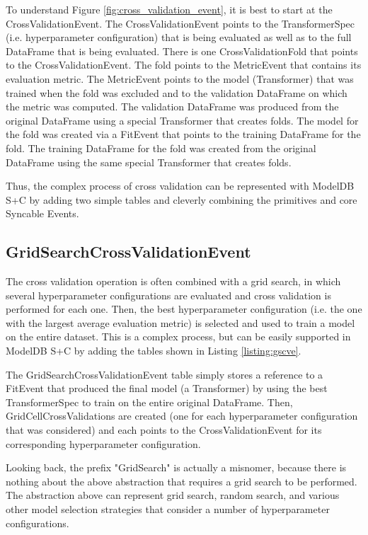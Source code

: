 To understand Figure \ref{fig:cross_validation_event}, it is best to start at the CrossValidationEvent.
The CrossValidationEvent points to the TransformerSpec (i.e. hyperparameter configuration) that is being evaluated
as well as to the full DataFrame that is being evaluated. There is one CrossValidationFold that points to the
CrossValidationEvent. The fold points to the MetricEvent that contains its evaluation metric. The MetricEvent
points to the model (Transformer) that was trained when the fold was excluded and to the validation DataFrame
on which the metric was computed. The validation DataFrame was produced from the original DataFrame using a special
Transformer that creates folds. The model for the fold was created via a FitEvent that points to the training DataFrame
for the fold. The training DataFrame for the fold was created from the original DataFrame using the same special Transformer that
creates folds.

Thus, the complex process of cross validation can be represented with ModelDB S+C by adding two simple tables and cleverly
combining the primitives and core Syncable Events.

\subsection{GridSearchCrossValidationEvent}
The cross validation operation is often combined with a grid search, in which several hyperparameter configurations
are evaluated and cross validation is performed for each one. Then, the best hyperparameter configuration (i.e. the one with the largest
average evaluation metric) is selected and used to train a model on the entire dataset. This is a complex process, but can be easily
supported in ModelDB S+C by adding the tables shown in Listing \ref{listing:gscve}.

The GridSearchCrossValidationEvent table simply stores a reference to a FitEvent
that produced the final model (a Transformer) by using the best TransformerSpec to
train on the entire original DataFrame. Then, GridCellCrossValidations are created
(one for each hyperparameter configuration that was considered) and each points to
the CrossValidationEvent for its corresponding hyperparameter configuration.

Looking back, the prefix "GridSearch" is actually a misnomer, because there is nothing about the
above abstraction that requires a grid search to be performed. The abstraction above
can represent grid search, random search, and various other model selection strategies that
consider a number of hyperparameter configurations.

